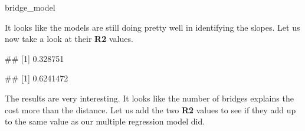\documentclass[
]{book}
\newenvironment{Shaded}{\begin{snugshade}}{\end{snugshade}}
\newcommand{\FunctionTok}[1]{\textcolor[rgb]{0.13,0.29,0.53}{\textbf{#1}}}
\newcommand{\NormalTok}[1]{#1}
\newcommand{\SpecialCharTok}[1]{\textcolor[rgb]{0.81,0.36,0.00}{\textbf{#1}}}
\begin{document}
\begin{Shaded}
\begin{Highlighting}[]
\NormalTok{bridge\_model}
\end{Highlighting}
\end{Shaded}

\begin{Shaded}
\end{Shaded}

It looks like the models are still doing pretty well in identifying the slopes. Let us now take a look at their \textbf{R2} values.

\begin{Shaded}
\end{Shaded}

\begin{Shaded}
\begin{Highlighting}[]
\NormalTok{\#\# [1] 0.328751}
\end{Highlighting}
\end{Shaded}

\begin{Shaded}
\end{Shaded}

\begin{Shaded}
\begin{Highlighting}[]
\NormalTok{\#\# [1] 0.6241472}
\end{Highlighting}
\end{Shaded}

The results are very interesting. It looks like the number of bridges explains the cost more than the distance. Let us add the two \textbf{R2} values to see if they add up to the same value as our multiple regression model did.
\end{document}
